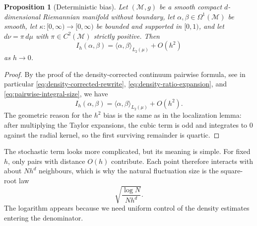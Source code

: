 \documentclass[a4paper,11pt, DIV=10]{scrartcl}
\numberwithin{equation}{section}
\newtheorem{proposition}[theorem]{Proposition}
\theoremstyle{definition}
\theoremstyle{remark}
\newcommand{\mc}[1]{\mathcal{#1}}
\begin{document}
\begin{proposition}[Deterministic bias]
Let $(\mc{M},g)$ be a smooth compact $d$-dimensional Riemannian manifold without boundary, let $\alpha,\beta\in \Omega^1(\mc{M})$ be smooth, let $\kappa\colon [0,\infty)\to [0,\infty)$ be bounded and supported in $[0,1)$, and let $d\nu=\pi\,d\mu$ with $\pi\in C^2(\mc{M})$ strictly positive. Then
\begin{equation}
I_h(\alpha,\beta)
=
\langle \alpha,\beta\rangle_{L_2(\mu)}+O(h^2)
\end{equation}
as $h\to 0$.
\end{proposition}
\begin{proof}
By the proof of the density-corrected continuum pairwise formula, see in particular \eqref{eq:density-corrected-rewrite}, \eqref{eq:density-ratio-expansion}, and \eqref{eq:pairwise-integral-size}, we have
\begin{equation}
I_h(\alpha,\beta)
=
\langle \alpha,\beta\rangle_{L_2(\mu)}+O(h^2).
\end{equation}
The geometric reason for the $h^2$ bias is the same as in the localization lemma: after multiplying the Taylor expansions, the cubic term is odd and integrates to $0$ against the radial kernel, so the first surviving remainder is quartic.
\end{proof}

The stochastic term looks more complicated, but its meaning is simple. For fixed $h$, only pairs with distance $O(h)$ contribute. Each point therefore interacts with about $N h^d$ neighbours, which is why the natural fluctuation size is the square-root law
\begin{equation}
\sqrt{\frac{\log N}{N h^d}}.
\end{equation}
The logarithm appears because we need uniform control of the density estimates entering the denominator.
\end{document}
